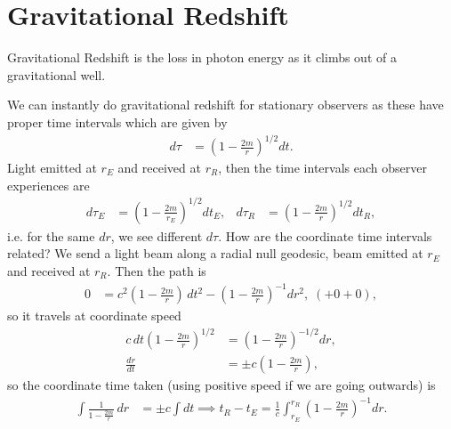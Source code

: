 \documentclass[a4paper, 11pt, normalem]{report}
\begin{document}
\section{Gravitational Redshift}
Gravitational Redshift is the loss in photon energy as it climbs out of a gravitational well. 
\begin{figure}[H]
    \centering
\end{figure}
We can instantly do gravitational redshift for stationary observers as these have proper time intervals which are given by 
\begin{align}
    d\tau &= \left(1-\frac{2m}{r}\right)^{1/2}dt.
\end{align}
Light emitted at $r_E$ and received at $r_R$, then the time intervals each observer experiences are
\begin{align}
    d\tau_E &= \left(1-\frac{2m}{r_E}\right)^{1/2}dt_E, & d\tau_R &= \left(1-\frac{2m}{r}\right)^{1/2}dt_R,
\end{align}
i.e. for the same $dr$, we see different $d\tau$.
How are the coordinate time intervals related?
We send a light beam along a radial null geodesic, beam emitted at $r_E$ and received at $r_R$. 
Then the path is
\begin{align}
    0 &= c^2\left(1-\frac{2m}{r}\right)\,dt^2 - \left(1-\frac{2m}{r}\right)^{-1}dr^2,\; (+0+0),
\end{align}
so it travels at coordinate speed
\begin{align}
    c\,dt\left(1-\frac{2m}{r}\right)^{1/2} &= \left(1-\frac{2m}{r}\right)^{-1/2}dr, \\
    \frac{dr}{dt} &= \pm c\left(1-\frac{2m}{r}\right),
\end{align}
so the coordinate time taken (using positive speed if we are going outwards) is
\begin{align}
    \int \frac{1}{1-\frac{2m}{r}}\,dr &= \pm c\int dt \implies t_R-t_E = \frac{1}{c}\int_{r_E}^{r_R} \left(1-\frac{2m}{r}\right)^{-1}dr.
\end{align}
\end{document}

